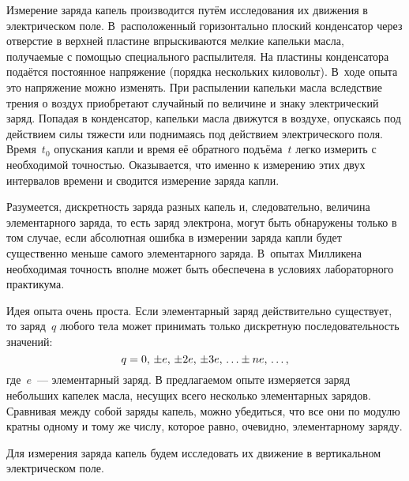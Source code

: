


Измерение заряда капель производится путём исследования их движения в
электрическом поле. В~расположенный горизонтально плоский конденсатор через
отверстие в верхней пластине впрыскиваются мелкие капельки масла, получаемые с
помощью специального распылителя. На пластины конденсатора подаётся постоянное
напряжение (порядка нескольких киловольт). В~ходе опыта это напряжение можно
изменять. При распылении капельки масла вследствие трения о воздух приобретают
случайный по величине и знаку электрический заряд. Попадая в конденсатор,
капельки масла движутся в воздухе, опускаясь под действием силы тяжести или
поднимаясь под действием электрического поля. Время~$t_0$ опускания капли и
время её обратного подъёма~$t$ легко измерить с необходимой точностью.
Оказывается, что именно к измерению этих двух интервалов времени и сводится
измерение заряда капли.

Разумеется, дискретность заряда разных капель и, следовательно, величина
элементарного заряда, то есть заряд электрона, могут быть обнаружены только в
том случае, если абсолютная ошибка в измерении заряда капли будет существенно
меньше самого элементарного заряда. В~опытах Милликена необходимая точность
вполне может быть обеспечена в условиях лабораторного практикума.
\todo[inline,color=cyan]{<---}

Идея опыта очень проста. Если элементарный заряд действительно существует, то
заряд~$q$ любого тела может принимать
только дискретную последовательность значений:
\begin{equation}
	q=0,\,\pm e,\,\pm 2e,\,\pm 3e,\,\ldots\pm ne,\,\ldots,
	\eqmark{3.3.1}
\end{equation}
где~$e$~--- элементарный заряд. В предлагаемом опыте измеряется заряд небольших
капелек масла, несущих всего несколько элементарных зарядов. Сравнивая между
собой заряды капель, можно убедиться, что все они по модулю кратны одному и тому
же числу, которое равно, очевидно, элементарному заряду.

Для измерения заряда капель будем исследовать их движение в вертикальном
электрическом поле.

